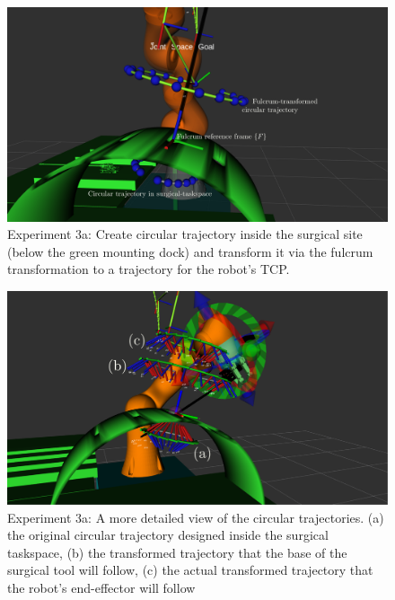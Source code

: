 \begin{center}
\begin{figure}[!htb]
\centering
\includegraphics[width=\textwidth]{images/robot_planner3/3a_circle.png}
\caption{Experiment 3a: Create circular trajectory inside the surgical site (below the green mounting dock) and transform it via the fulcrum transformation to a trajectory for the robot's TCP.}
\label{robot-planner3a-circle}
\end{figure}
\end{center}

\begin{center}
\begin{figure}[!htb]
\centering
\includegraphics[width=\textwidth]{images/robot_planner3/3a_circle_details.png}
\caption{Experiment 3a: A more detailed view of the circular trajectories. (a) the original circular trajectory designed inside the surgical taskspace, (b) the transformed trajectory that the base of the surgical tool will
 follow, (c) the actual transformed trajectory that the robot's end-effector will follow}
\label{robot-planner3a-circle-details}
\end{figure}
\end{center}

